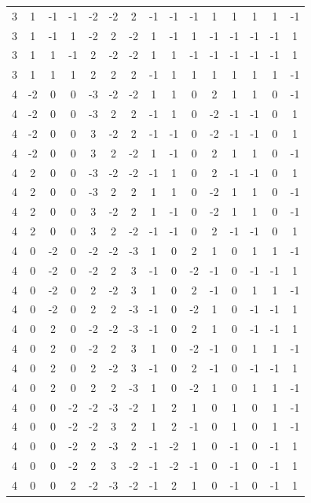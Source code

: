 \documentclass[aps,english,10pt,superscriptaddress,onecolumn,twoside,longbibliography,pra,floatfix,fleqn,nofootinbib]{revtex4-1}
\theoremstyle{definition}
\begin{document}
\begin{table}[hb]
{\begin{tabular}{c@{\hspace{1em}}ccc@{\hspace{1em}}ccc@{\hspace{1em}}c@{\hspace{1em}}ccc@{\hspace{1em}}ccc@{\hspace{1em}}c}
 3 & 1 & -1 & -1 & -2 & -2 & 2 & -1 & -1 & -1 & 1 & 1 & 1 & 1 & -1 \\
 3 & 1 & -1 & 1 & -2 & 2 & -2 & 1 & -1 & 1 & -1 & -1 & -1 & -1 & 1 \\
 3 & 1 & 1 & -1 & 2 & -2 & -2 & 1 & 1 & -1 & -1 & -1 & -1 & -1 & 1 \\
 3 & 1 & 1 & 1 & 2 & 2 & 2 & -1 & 1 & 1 & 1 & 1 & 1 & 1 & -1 \\
 4 & -2 & 0 & 0 & -3 & -2 & -2 & 1 & 1 & 0 & 2 & 1 & 1 & 0 & -1 \\
 4 & -2 & 0 & 0 & -3 & 2 & 2 & -1 & 1 & 0 & -2 & -1 & -1 & 0 & 1 \\
 4 & -2 & 0 & 0 & 3 & -2 & 2 & -1 & -1 & 0 & -2 & -1 & -1 & 0 & 1 \\
 4 & -2 & 0 & 0 & 3 & 2 & -2 & 1 & -1 & 0 & 2 & 1 & 1 & 0 & -1 \\
 4 & 2 & 0 & 0 & -3 & -2 & -2 & -1 & 1 & 0 & 2 & -1 & -1 & 0 & 1 \\
 4 & 2 & 0 & 0 & -3 & 2 & 2 & 1 & 1 & 0 & -2 & 1 & 1 & 0 & -1 \\
 4 & 2 & 0 & 0 & 3 & -2 & 2 & 1 & -1 & 0 & -2 & 1 & 1 & 0 & -1 \\
 4 & 2 & 0 & 0 & 3 & 2 & -2 & -1 & -1 & 0 & 2 & -1 & -1 & 0 & 1 \\
 4 & 0 & -2 & 0 & -2 & -2 & -3 & 1 & 0 & 2 & 1 & 0 & 1 & 1 & -1 \\
 4 & 0 & -2 & 0 & -2 & 2 & 3 & -1 & 0 & -2 & -1 & 0 & -1 & -1 & 1 \\
 4 & 0 & -2 & 0 & 2 & -2 & 3 & 1 & 0 & 2 & -1 & 0 & 1 & 1 & -1 \\
 4 & 0 & -2 & 0 & 2 & 2 & -3 & -1 & 0 & -2 & 1 & 0 & -1 & -1 & 1 \\
 4 & 0 & 2 & 0 & -2 & -2 & -3 & -1 & 0 & 2 & 1 & 0 & -1 & -1 & 1 \\
 4 & 0 & 2 & 0 & -2 & 2 & 3 & 1 & 0 & -2 & -1 & 0 & 1 & 1 & -1 \\
 4 & 0 & 2 & 0 & 2 & -2 & 3 & -1 & 0 & 2 & -1 & 0 & -1 & -1 & 1 \\
 4 & 0 & 2 & 0 & 2 & 2 & -3 & 1 & 0 & -2 & 1 & 0 & 1 & 1 & -1 \\
 4 & 0 & 0 & -2 & -2 & -3 & -2 & 1 & 2 & 1 & 0 & 1 & 0 & 1 & -1 \\
 4 & 0 & 0 & -2 & -2 & 3 & 2 & 1 & 2 & -1 & 0 & 1 & 0 & 1 & -1 \\
 4 & 0 & 0 & -2 & 2 & -3 & 2 & -1 & -2 & 1 & 0 & -1 & 0 & -1 & 1 \\
 4 & 0 & 0 & -2 & 2 & 3 & -2 & -1 & -2 & -1 & 0 & -1 & 0 & -1 & 1 \\
 4 & 0 & 0 & 2 & -2 & -3 & -2 & -1 & 2 & 1 & 0 & -1 & 0 & -1 & 1 \\

\end{tabular}}
\end{table}
\end{document}
